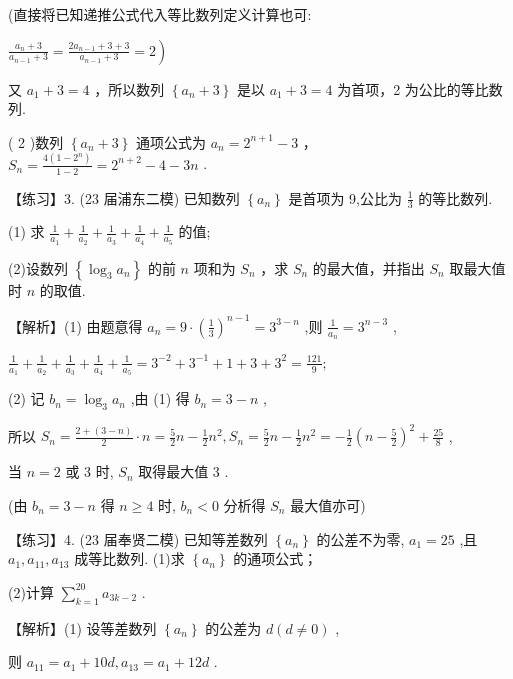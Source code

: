 \documentclass[10pt]{article}
\begin{document}
(直接将已知递推公式代入等比数列定义计算也可:

\(\left. {\frac{{a}_{n} + 3}{{a}_{n - 1} + 3} = \frac{2{a}_{n - 1} + 3 + 3}{{a}_{n - 1} + 3} = 2}\right)\)

又 \({a}_{1} + 3 = 4\) ，所以数列 \(\left\{  {{a}_{n} + 3}\right\}\) 是以 \({a}_{1} + 3 = 4\) 为首项，2 为公比的等比数列.

( 2 )数列 \(\left\{  {{a}_{n} + 3}\right\}\) 通项公式为 \({a}_{n} = {2}^{n + 1} - 3\) ， \({S}_{n} = \frac{4\left( {1 - {2}^{n}}\right) }{1 - 2} = {2}^{n + 2} - {4 - {3n}}\) .

【练习】3. (23 届浦东二模) 已知数列 \(\left\{  {a}_{n}\right\}\) 是首项为 9,公比为 \(\frac{1}{3}\) 的等比数列.

(1) 求 \(\frac{1}{{a}_{1}} + \frac{1}{{a}_{2}} + \frac{1}{{a}_{3}} + \frac{1}{{a}_{4}} + \frac{1}{{a}_{5}}\) 的值;

(2)设数列 \(\left\{  {{\log }_{3}{a}_{n}}\right\}\) 的前 \(n\) 项和为 \({S}_{n}\) ，求 \({S}_{n}\) 的最大值，并指出 \({S}_{n}\) 取最大值时 \(n\) 的取值.

【解析】(1) 由题意得 \({a}_{n} = 9 \cdot  {\left( \frac{1}{3}\right) }^{n - 1} = {3}^{3 - n}\) ,则 \(\frac{1}{{a}_{n}} = {3}^{n - 3}\) ,

\(\frac{1}{{a}_{1}} + \frac{1}{{a}_{2}} + \frac{1}{{a}_{3}} + \frac{1}{{a}_{4}} + \frac{1}{{a}_{5}} = {3}^{-2} + {3}^{-1} + 1 + 3 + {3}^{2} = \frac{121}{9};\)

(2) 记 \({b}_{n} = {\log }_{3}{a}_{n}\) ,由 (1) 得 \({b}_{n} = 3 - n\) ,

所以 \({S}_{n} = \frac{2 + \left( {3 - n}\right) }{2} \cdot  n = \frac{5}{2}n - \frac{1}{2}{n}^{2},{S}_{n} = \frac{5}{2}n - \frac{1}{2}{n}^{2} =  - \frac{1}{2}{\left( n - \frac{5}{2}\right) }^{2} + \frac{25}{8}\) ,

当 \(n = 2\) 或 3 时, \({S}_{n}\) 取得最大值 3 .

(由 \({b}_{n} = 3 - n\) 得 \(n \geq  4\) 时, \({b}_{n} < 0\) 分析得 \({S}_{n}\) 最大值亦可)

【练习】4. (23 届奉贤二模) 已知等差数列 \(\left\{  {a}_{n}\right\}\) 的公差不为零, \({a}_{1} = {25}\) ,且 \({a}_{1},{a}_{11},{a}_{13}\) 成等比数列. (1)求 \(\left\{  {a}_{n}\right\}\) 的通项公式；

(2)计算 \(\mathop{\sum }\limits_{{k = 1}}^{{20}}{a}_{{3k} - 2}\) .

【解析】(1) 设等差数列 \(\left\{  {a}_{n}\right\}\) 的公差为 \(d\left( {d \neq  0}\right)\) ,

则 \({a}_{11} = {a}_{1} + {10d},{a}_{13} = {a}_{1} + {12d}\) .
\end{document}
